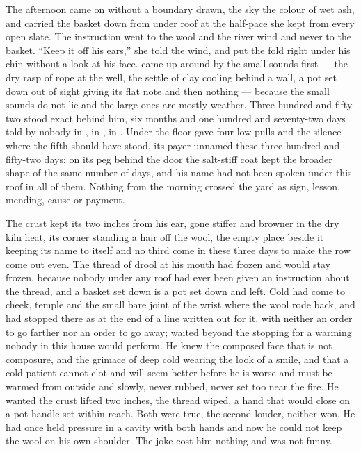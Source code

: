 The afternoon came on without a boundary drawn, the sky the colour of wet ash, and  carried the basket down from under  roof at the half-pace she kept from every open slate. The instruction went to the wool and the river wind and never to the basket. “Keep it off his ears,” she told the wind, and put the fold right under his chin without a look at his face.  came up around  by the small sounds first --- the dry rasp of rope at the well, the settle of clay cooling behind a wall, a pot set down out of sight giving its flat note and then nothing --- because the small sounds do not lie and the large ones are mostly weather. Three hundred and fifty-two stood exact behind him, six months and one hundred and seventy-two days told by nobody in , in , in . Under the floor  gave four low pulls and the silence where the fifth should have stood, its payer unnamed these three hundred and fifty-two days; on its peg behind the door the salt-stiff coat kept the broader shape of  the same number of days, and his name had not been spoken under this roof in all of them. Nothing from the morning crossed the yard as sign, lesson, mending, cause or payment.

The crust kept its two inches from his ear, gone stiffer and browner in the dry kiln heat, its corner standing a hair off the wool, the empty place beside it keeping its name to itself and no third come in these three days to make the row come out even. The thread of drool at his mouth had frozen and would stay frozen, because nobody under any roof had ever been given an instruction about the thread, and a basket set down is a pot set down and left. Cold had come to cheek, temple and the small bare joint of the wrist where the wool rode back, and had stopped there as at the end of a line written out for it, with neither an order to go farther nor an order to go away;  waited beyond the stopping for a warming nobody in this house would perform. He knew the composed face that is not composure, and the grimace of deep cold wearing the look of a smile, and that a cold patient cannot clot and will seem better before he is worse and must be warmed from outside and slowly, never rubbed, never set too near the fire. He wanted the crust lifted two inches, the thread wiped, a hand that would close on a pot handle set within reach. Both were true, the second louder, neither won. He had once held pressure in a cavity with both hands and now he could not keep the wool on his own shoulder. The joke cost him nothing and was not funny.

